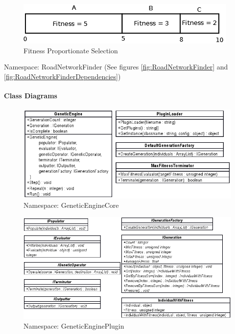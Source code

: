 \begin{figure}[ht!]
 \caption{Fitness Proportionate Selection}\label{fig:FitnessProportionateSelection}
 \centering
 \includegraphics[scale=0.5]{../Stochastic.png}
\end{figure}

Namespace: RoadNetworkFinder (See figures \ref{fig:RoadNetworkFinder} and \ref{fig:RoadNetworkFinderDependencies})

\paragraph{Class Diagrams}

\begin{figure}[ht!]
 \caption{Namespace: GeneticEngineCore}\label{fig:GeneticEngineCore}
 \centering
 \includegraphics[width=\textwidth]{../GeneticEngineCoreDetail.png}
\end{figure}

\begin{figure}[ht!]
 \caption{Namespace: GeneticEnginePlugin}\label{fig:GeneticEnginePlugin}
 \centering
 \includegraphics[width=\textwidth]{../GeneticEnginePluginDetail.png}
\end{figure}

